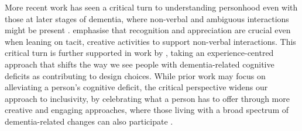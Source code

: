 More recent work has seen a critical turn to understanding personhood even with those at later stages of dementia, where non-verbal and ambiguous interactions might be present \citep{lazar_critical_2017}. \cite{treadaway_sensor_2016} emphasise that recognition and appreciation are crucial even when leaning on tacit, creative activities to support non-verbal interactions. This critical turn is further supported in work by \cite{morrissey_value_2017}, taking an experience-centred approach that shifts the way we see people with dementia-related cognitive deficits as contributing to design choices. While prior work may focus on alleviating a person's cognitive deficit, the critical perspective widens our approach to inclusivity, by celebrating what a person has to offer through more creative and engaging approaches, where those living with a broad spectrum of dementia-related changes can also participate \citep{foley_printer_2019}.


